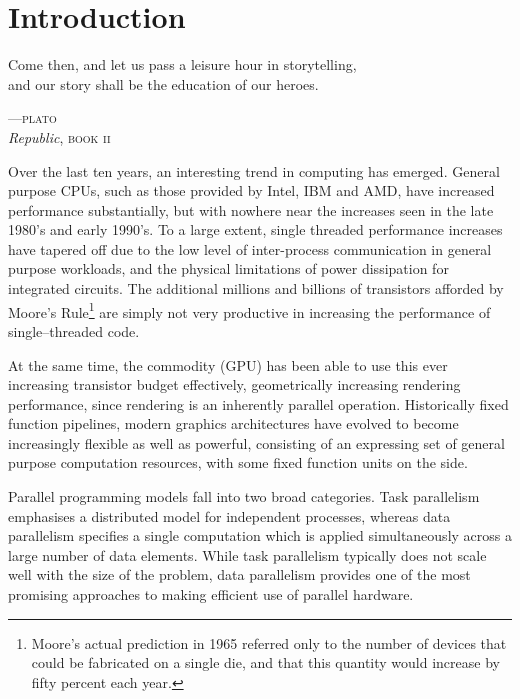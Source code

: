 %
%

\chapter{Introduction}
\epigraph{Come then, and let us pass a leisure hour in 
storytelling,\\and our story shall be the education of our heroes.}%
{\textsc{---plato}\\\textit{Republic}, \textsc{book ii}}


Over the last ten years, an interesting trend in computing has emerged. General
purpose CPUs, such as those provided by Intel, IBM and AMD, have increased
performance substantially, but with nowhere near the increases seen in the late
1980's and early 1990's. To a large extent, single threaded performance
increases have tapered off due to the low level of inter-process communication
in general purpose workloads, and the physical limitations of power dissipation
for integrated circuits. The additional millions and billions of transistors
afforded by Moore's Rule\footnote{Moore's actual prediction in 1965 referred
only to the number of devices that could be fabricated on a single die, and that
this quantity would increase by fifty percent each year.} are simply not very
productive in increasing the performance of single--threaded code.

At the same time, the commodity  (GPU) has been
able to use this ever increasing transistor budget effectively, geometrically
increasing rendering performance, since rendering is an inherently parallel
operation. Historically fixed function pipelines, modern graphics architectures
have evolved to become increasingly flexible as well as powerful, consisting of
an expressing set of general purpose computation resources, with some fixed
function units on the side.

Parallel programming models fall into two broad categories. Task parallelism
emphasises a distributed model for independent processes, whereas data
parallelism specifies a single computation which is applied simultaneously
across a large number of data elements. While task parallelism typically does not
scale well with the size of the problem, data parallelism provides one of the
most promising approaches to making efficient use of parallel hardware.

